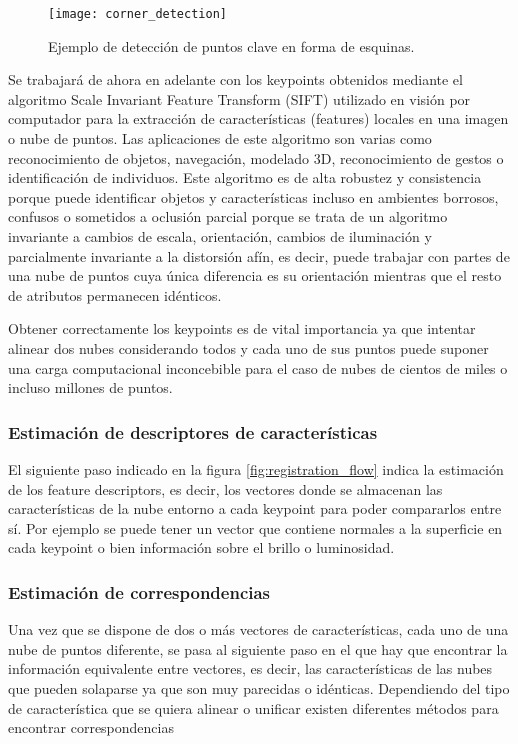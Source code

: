 \begin{figure}
\centering
\texttt{[image: corner\_detection]}
\caption{Ejemplo de detección de puntos clave en forma de esquinas.}\label{fig:corner_detection}
\end{figure}


Se trabajará de ahora en adelante con los keypoints obtenidos mediante el algoritmo Scale Invariant Feature Transform (SIFT)\cite{sift_opencv} utilizado en visión por computador para la extracción de características (features) locales en una imagen o nube de puntos. Las aplicaciones de este algoritmo son varias como reconocimiento de objetos, navegación, modelado 3D, reconocimiento de gestos o identificación de individuos. Este algoritmo es de alta robustez y consistencia porque puede identificar objetos y características incluso en ambientes borrosos, confusos o sometidos a oclusión parcial porque se trata de un algoritmo invariante a cambios de escala, orientación, cambios de iluminación y parcialmente invariante a la distorsión afín, es decir, puede trabajar con partes de una nube de puntos cuya única diferencia es su orientación mientras que el resto de atributos permanecen idénticos.

Obtener correctamente los keypoints es de vital importancia ya que intentar alinear dos nubes considerando todos y cada uno de sus puntos puede suponer una carga computacional inconcebible para el caso de nubes de cientos de miles o incluso millones de puntos. 

\subsubsection{Estimación de descriptores de características}
El siguiente paso indicado en la figura \ref{fig:registration_flow} indica la estimación de los feature descriptors, es decir, los vectores donde se almacenan las características de la nube entorno a cada keypoint para poder compararlos entre sí. Por ejemplo se puede tener un vector que contiene normales a la superficie en cada keypoint o bien información sobre el brillo o luminosidad.

\subsubsection{Estimación de correspondencias}
Una vez que se dispone de dos o más vectores de características, cada uno de una nube de puntos diferente, se pasa al siguiente paso en el que hay que encontrar la información equivalente entre vectores, es decir, las características de las nubes que pueden solaparse ya que son muy parecidas o idénticas. Dependiendo del tipo de característica que se quiera alinear o unificar existen diferentes métodos para encontrar correspondencias\cite{paper_registration}

